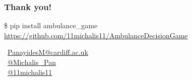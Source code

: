 \begin{frame}
    \frametitle{\Large{Thank you!}}
    \centering


    \vspace{1.5cm}
    \small{\$ pip install ambulance\_game}
    \small{\url{https://github.com/11michalis11/AmbulanceDecisionGame}}


    \vspace{1.5cm}
    \faEnvelope \, \url{PanayidesM@cardiff.ac.uk} \\
    \faTwitterSquare \, \url{@Michalis_Pan} \\
    \faGithubSquare \, \url{@11michalis11} \\

\end{frame}



